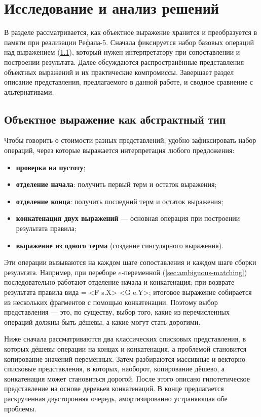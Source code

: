 \documentclass[14pt, russian]{scrartcl}
\renewcommand{\emph}[1]{#1}
\newcommand{\prog}[1]{{\ttfamily\small#1}}
\begin{document}
\section{Исследование и анализ решений}
\label{sec:research}

В разделе рассматривается, как объектное выражение хранится и преобразуется в
памяти при реализации Рефала-5. Сначала фиксируется набор базовых операций над
выражением (\ref{sec:adt-ops}), который нужен интерпретатору при сопоставлении и
построении результата. Далее обсуждаются распространённые представления объектных
выражений и их практические компромиссы. Завершает раздел описание представления,
предлагаемого в данной работе, и сводное сравнение с альтернативами.

\subsection{Объектное выражение как абстрактный тип}
\label{sec:adt-ops}

Чтобы говорить о стоимости разных представлений, удобно зафиксировать набор
операций, через которые выражается интерпретация любого предложения:

\begin{itemize}
  \item \textbf{проверка на пустоту};
  \item \textbf{отделение начала}: получить первый терм и остаток выражения;
  \item \textbf{отделение конца}: получить последний терм и остаток выражения;
  \item \textbf{конкатенация двух выражений} --- основная операция при
        построении результата правила;
  \item \textbf{выражение из одного терма} (создание сингулярного выражения).
\end{itemize}

Эти операции вызываются на каждом шаге сопоставления и каждом шаге сборки
результата. Например, при переборе \(e\)-переменной
(\ref{sec:ambiguous-matching}) последовательно работают отделение начала
и конкатенация; при возврате результата правила вида \prog{= <F s.X> <G
e.Y>;} итоговое выражение собирается из нескольких фрагментов с помощью
конкатенации. Поэтому выбор представления --- это, по существу, выбор
того, какие из перечисленных операций должны быть дёшевы, а какие могут
стать дорогими.

Ниже сначала рассматриваются два классических списковых представления, в
которых дёшевы операции на концах и конкатенация, а проблемой становится
\emph{копирование} значений переменных. Затем разбираются массивные и
векторно-списковые представления, в которых, наоборот, копирование дёшево, а
\emph{конкатенация} может становиться дорогой. После этого описано
гипотетическое представление на основе деревьев конкатенаций. В конце
предлагается раскрученная двусторонняя очередь, амортизированно
устраняющая обе проблемы.
\end{document}
